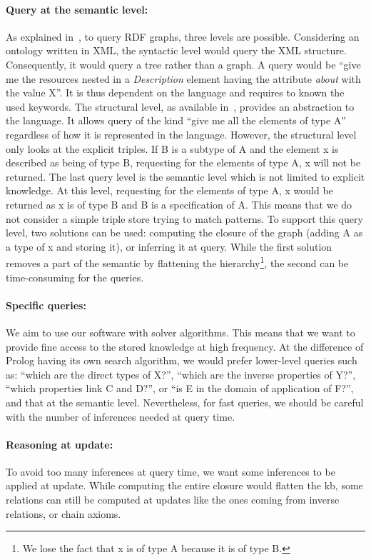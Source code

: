 \paragraph{Query at the semantic level:} As explained in~\cite{broekstra_2002_sesame}, to query RDF graphs, three levels are possible. Considering an ontology written in XML, the syntactic level would query the XML structure. Consequently, it would query a tree rather than a graph. A query would be ``give me the resources nested in a \textit{Description} element having the attribute \textit{about} with the value X''. It is thus dependent on the language and requires to known the used keywords. The structural level, as available in~\cite{lassila_1998_resource}, provides an abstraction to the language. It allows query of the kind ``give me all the elements of type A'' regardless of how it is represented in the language. However, the structural level only looks at the explicit triples. If B is a subtype of A and the element x is described as being of type B, requesting for the elements of type A, x will not be returned. The last query level is the semantic level which is not limited to explicit knowledge. At this level, requesting for the elements of type A, x would be returned as x is of type B and B is a specification of A. This means that we do not consider a simple triple store trying to match patterns. To support this query level, two solutions can be used: computing the closure of the graph (adding A as a type of x and storing it), or inferring it at query. While the first solution removes a part of the semantic by flattening the hierarchy\footnote{We lose the fact that x is of type A because it is of type B.}, the second can be time-consuming for the queries.

\paragraph{Specific queries:} We aim to use our software with solver algorithms. This means that we want to provide fine access to the stored knowledge at high frequency. At the difference of Prolog having its own search algorithm, we would prefer lower-level queries such as: ``which are the direct types of X?'', ``which are the inverse properties of Y?'', ``which properties link C and D?'', or ``is E in the domain of application of F?'', and that at the semantic level. Nevertheless, for fast queries, we should be careful with the number of inferences needed at query time.

\paragraph{Reasoning at update:} To avoid too many inferences at query time, we want some inferences to be applied at update. While computing the entire closure would flatten the \acrshort{kb}, some relations can still be computed at updates like the ones coming from inverse relations, or chain axioms.

